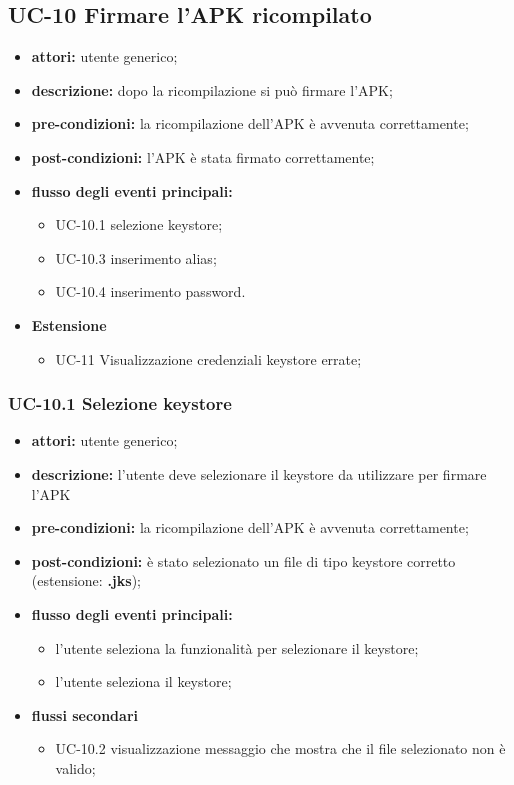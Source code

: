 \subsection*{UC-10 Firmare l'APK ricompilato}\label{subsec:uc-10-firmare-l'apk-ricompilato}
\begin{itemize}
    \item \textbf{attori:} utente generico;
    \item \textbf{descrizione:} dopo la ricompilazione si può firmare l'APK;
    \item \textbf{pre-condizioni:} la ricompilazione dell'APK è avvenuta correttamente;
    \item \textbf{post-condizioni:} l'APK è stata firmato correttamente;
    \item \textbf{flusso degli eventi principali:}
    \begin{itemize}
        \item UC-10.1 selezione keystore;
        \item UC-10.3 inserimento alias;
        \item UC-10.4 inserimento password.
    \end{itemize}
    \item \textbf{Estensione}
    \begin{itemize}
        \item UC-11 Visualizzazione credenziali keystore errate;
    \end{itemize}
\end{itemize}
\subsubsection*{UC-10.1 Selezione keystore}\label{subsubsec:uc-10.1-selezione-keystore}
\begin{itemize}
    \item \textbf{attori:} utente generico;
    \item \textbf{descrizione:} l'utente deve selezionare il keystore da utilizzare per firmare l'APK
    \item \textbf{pre-condizioni:} la ricompilazione dell'APK è avvenuta correttamente;
    \item \textbf{post-condizioni:} è stato selezionato un file di tipo keystore corretto (estensione: \textbf{.jks});
    \item \textbf{flusso degli eventi principali:}
    \begin{itemize}
        \item l'utente seleziona la funzionalità per selezionare il keystore;
        \item l'utente seleziona il keystore;
    \end{itemize}
    \item \textbf{flussi secondari}
    \begin{itemize}
        \item UC-10.2 visualizzazione messaggio che mostra che il file selezionato non è valido;
    \end{itemize}
\end{itemize}
